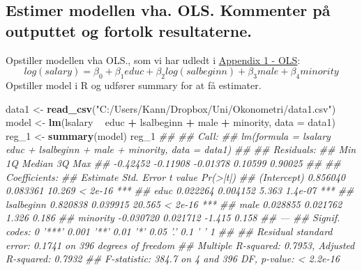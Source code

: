 \documentclass[
  10pt,
]{article}
\newenvironment{Shaded}{\begin{snugshade}}{\end{snugshade}}
\newcommand{\CommentTok}[1]{\textcolor[rgb]{0.56,0.35,0.01}{\textit{#1}}}
\newcommand{\DataTypeTok}[1]{\textcolor[rgb]{0.13,0.29,0.53}{#1}}
\newcommand{\DecValTok}[1]{\textcolor[rgb]{0.00,0.00,0.81}{#1}}
\newcommand{\KeywordTok}[1]{\textcolor[rgb]{0.13,0.29,0.53}{\textbf{#1}}}
\newcommand{\NormalTok}[1]{#1}
\newcommand{\OperatorTok}[1]{\textcolor[rgb]{0.81,0.36,0.00}{\textbf{#1}}}
\newcommand{\StringTok}[1]{\textcolor[rgb]{0.31,0.60,0.02}{#1}}
\begin{document}
\hypertarget{estimer-modellen-vha.-ols.-kommenter-puxe5-outputtet-og-fortolk-resultaterne.}{%
\subsection{Estimer modellen vha. OLS. Kommenter på outputtet og fortolk
resultaterne.}\label{estimer-modellen-vha.-ols.-kommenter-puxe5-outputtet-og-fortolk-resultaterne.}}

\leavevmode

Opstiller modellen vha OLS., som vi har udledt i
\hyperref[sec:OLS]{Appendix 1 - OLS}:
\[ log(salary) = \beta_0+\beta_1educ+\beta_2log(salbeginn)+\beta_3male+\beta_4minority\]
Opstiller model i R og udfører summary for at få estimater.

\begin{Shaded}
\begin{Highlighting}[]
\NormalTok{data1 <-}\StringTok{ }\KeywordTok{read_csv}\NormalTok{(}\StringTok{"C:/Users/Kann/Dropbox/Uni/Okonometri/data1.csv"}\NormalTok{)}
\NormalTok{model <-}\StringTok{ }\KeywordTok{lm}\NormalTok{(lsalary }\OperatorTok{~}\StringTok{ }\NormalTok{educ }\OperatorTok{+}\StringTok{ }\NormalTok{lsalbeginn }\OperatorTok{+}\StringTok{ }\NormalTok{male }\OperatorTok{+}\StringTok{ }\NormalTok{minority, }\DataTypeTok{data =}\NormalTok{ data1)}
\NormalTok{reg_}\DecValTok{1}\NormalTok{ <-}\StringTok{ }\KeywordTok{summary}\NormalTok{(model)}
\NormalTok{reg_}\DecValTok{1}
\CommentTok{## }
\CommentTok{## Call:}
\CommentTok{## lm(formula = lsalary ~ educ + lsalbeginn + male + minority, data = data1)}
\CommentTok{## }
\CommentTok{## Residuals:}
\CommentTok{##      Min       1Q   Median       3Q      Max }
\CommentTok{## -0.42452 -0.11908 -0.01378  0.10599  0.90025 }
\CommentTok{## }
\CommentTok{## Coefficients:}
\CommentTok{##              Estimate Std. Error t value Pr(>|t|)    }
\CommentTok{## (Intercept)  0.856040   0.083361  10.269  < 2e-16 ***}
\CommentTok{## educ         0.022264   0.004152   5.363  1.4e-07 ***}
\CommentTok{## lsalbeginn   0.820838   0.039915  20.565  < 2e-16 ***}
\CommentTok{## male         0.028855   0.021762   1.326    0.186    }
\CommentTok{## minority    -0.030720   0.021712  -1.415    0.158    }
\CommentTok{## ---}
\CommentTok{## Signif. codes:  0 '***' 0.001 '**' 0.01 '*' 0.05 '.' 0.1 ' ' 1}
\CommentTok{## }
\CommentTok{## Residual standard error: 0.1741 on 396 degrees of freedom}
\CommentTok{## Multiple R-squared:  0.7953, Adjusted R-squared:  0.7932 }
\CommentTok{## F-statistic: 384.7 on 4 and 396 DF,  p-value: < 2.2e-16}
\end{Highlighting}
\end{Shaded}
\end{document}
